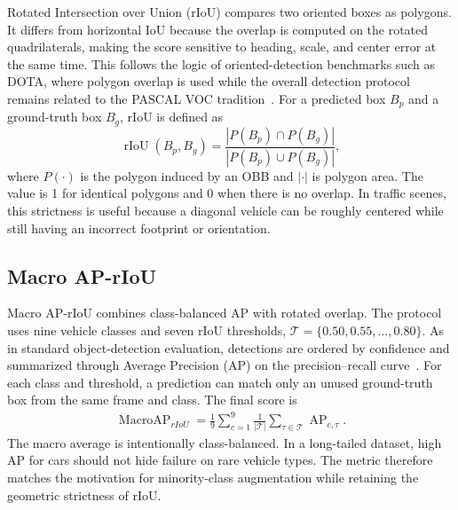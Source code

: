 Rotated Intersection over Union (rIoU) compares two oriented boxes as polygons. It differs from horizontal IoU because the overlap is computed on the rotated quadrilaterals, making the score sensitive to heading, scale, and center error at the same time. This follows the logic of oriented-detection benchmarks such as DOTA, where polygon overlap is used while the overall detection protocol remains related to the PASCAL VOC tradition~\cite{Ding2022DOTA,Everingham2015PASCAL}. For a predicted box $B_p$ and a ground-truth box $B_g$, rIoU is defined as
\begin{equation}
  \operatorname{rIoU}(B_p,B_g) =
  \frac{\left|P(B_p)\cap P(B_g)\right|}
       {\left|P(B_p)\cup P(B_g)\right|},
  \label{eq:riou}
\end{equation}
where $P(\cdot)$ is the polygon induced by an OBB and $|\cdot|$ is polygon area. The value is 1 for identical polygons and 0 when there is no overlap. In traffic scenes, this strictness is useful because a diagonal vehicle can be roughly centered while still having an incorrect footprint or orientation.

\subsection{Macro AP-rIoU}
\label{sec:macro_ap_riou}

Macro AP-rIoU combines class-balanced AP with rotated overlap. The protocol uses nine vehicle classes and seven rIoU thresholds, $\mathcal{T}=\{0.50,0.55,\ldots,0.80\}$. As in standard object-detection evaluation, detections are ordered by confidence and summarized through Average Precision (AP) on the precision--recall curve~\cite{Everingham2015PASCAL,Lin2014COCO}. For each class and threshold, a prediction can match only an unused ground-truth box from the same frame and class. The final score is
\begin{equation}
\begin{aligned}
  \operatorname{MacroAP}_{rIoU}
  = \frac{1}{9}\sum_{c=1}^{9}
    \frac{1}{|\mathcal{T}|}\sum_{\tau\in\mathcal{T}}
    \operatorname{AP}_{c,\tau}.
\end{aligned}
\label{eq:macro_ap_riou}
\end{equation}
The macro average is intentionally class-balanced. In a long-tailed dataset, high AP for cars should not hide failure on rare vehicle types. The metric therefore matches the motivation for minority-class augmentation while retaining the geometric strictness of rIoU.

